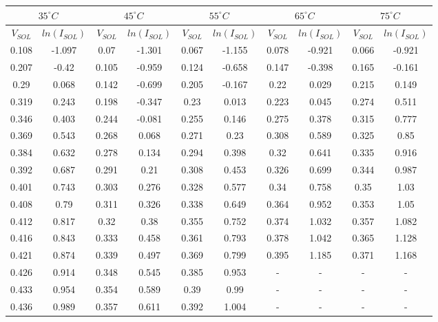 \documentclass[12pt]{article}
\begin{document}
\begin{center}
 \begin{tabular}{|| c c | c c | c c | c c | c c ||} 
 \hline
 \multicolumn{2}{||c|}{\(35^{\circ}C\)} & \multicolumn{2}{c|}{\(45^{\circ}C\)} & \multicolumn{2}{c||}{\(55^{\circ}C\)} & \multicolumn{2}{c||}{\(65^{\circ}C\)} & \multicolumn{2}{c||}{\(75^{\circ}C\)}\\
 \hline
 \hline
 \( V_{SOL}\) & \( ln(I_{SOL}) \) & \( V_{SOL} \) & \( ln(I_{SOL}) \) & \( V_{SOL} \) & \( ln(I_{SOL}) \) & \( V_{SOL} \) & \( ln(I_{SOL}) \) & \( V_{SOL} \) & \( ln(I_{SOL}) \) \\ [0.25ex] 
 \hline\hline
 \hline 
0.108 & -1.097 & 0.07 & -1.301 & 0.067 & -1.155 & 0.078 & -0.921 & 0.066 & -0.921 \\ \hline 
0.207 & -0.42 & 0.105 & -0.959 & 0.124 & -0.658 & 0.147 & -0.398 & 0.165 & -0.161 \\ \hline 
0.29 & 0.068 & 0.142 & -0.699 & 0.205 & -0.167 & 0.22 & 0.029 & 0.215 & 0.149 \\ \hline 
0.319 & 0.243 & 0.198 & -0.347 & 0.23 & 0.013 & 0.223 & 0.045 & 0.274 & 0.511 \\ \hline 
0.346 & 0.403 & 0.244 & -0.081 & 0.255 & 0.146 & 0.275 & 0.378 & 0.315 & 0.777 \\ \hline 
0.369 & 0.543 & 0.268 & 0.068 & 0.271 & 0.23 & 0.308 & 0.589 & 0.325 & 0.85 \\ \hline 
0.384 & 0.632 & 0.278 & 0.134 & 0.294 & 0.398 & 0.32 & 0.641 & 0.335 & 0.916 \\ \hline 
0.392 & 0.687 & 0.291 & 0.21 & 0.308 & 0.453 & 0.326 & 0.699 & 0.344 & 0.987 \\ \hline 
0.401 & 0.743 & 0.303 & 0.276 & 0.328 & 0.577 & 0.34 & 0.758 & 0.35 & 1.03 \\ \hline 
0.408 & 0.79 & 0.311 & 0.326 & 0.338 & 0.649 & 0.364 & 0.952 & 0.353 & 1.05 \\ \hline 
0.412 & 0.817 & 0.32 & 0.38 & 0.355 & 0.752 & 0.374 & 1.032 & 0.357 & 1.082 \\ \hline 
0.416 & 0.843 & 0.333 & 0.458 & 0.361 & 0.793 & 0.378 & 1.042 & 0.365 & 1.128 \\ \hline 
0.421 & 0.874 & 0.339 & 0.497 & 0.369 & 0.799 & 0.395 & 1.185 & 0.371 & 1.168 \\ \hline 
0.426 & 0.914 & 0.348 & 0.545 & 0.385 & 0.953 & - & - & - & - \\ \hline 
0.433 & 0.954 & 0.354 & 0.589 & 0.39 & 0.99 & - & - & - & - \\ \hline 
0.436 & 0.989 & 0.357 & 0.611 & 0.392 & 1.004 & - & - & - & - \\ \hline 

\end{tabular}
\end{center}
\end{document}
